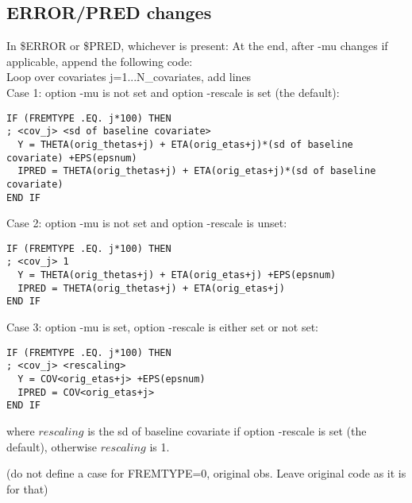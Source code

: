 \subsection{ERROR/PRED changes}
In \$ERROR or \$PRED, whichever is present:
At the end, after -mu changes if applicable, append the following code: \\
Loop over covariates j=1...N\_covariates, %
add lines\\
Case 1: option -mu is not set and option -rescale is set (the default):\\
\begin{verbatim}
IF (FREMTYPE .EQ. j*100) THEN
; <cov_j> <sd of baseline covariate>
  Y = THETA(orig_thetas+j) + ETA(orig_etas+j)*(sd of baseline covariate) +EPS(epsnum)
  IPRED = THETA(orig_thetas+j) + ETA(orig_etas+j)*(sd of baseline covariate)
END IF
\end{verbatim}

\noindent Case 2: option -mu is not set and option -rescale is unset:\\
\begin{verbatim}
IF (FREMTYPE .EQ. j*100) THEN
; <cov_j> 1
  Y = THETA(orig_thetas+j) + ETA(orig_etas+j) +EPS(epsnum)
  IPRED = THETA(orig_thetas+j) + ETA(orig_etas+j)
END IF
\end{verbatim}


\noindent Case 3: option -mu is set, option -rescale is either set or not set:\\
\begin{verbatim}
IF (FREMTYPE .EQ. j*100) THEN
; <cov_j> <rescaling>
  Y = COV<orig_etas+j> +EPS(epsnum)
  IPRED = COV<orig_etas+j>
END IF
\end{verbatim}
where $rescaling$ is the sd of baseline covariate if option -rescale is set (the default), otherwise $rescaling$ is 1.


(do not define a case for FREMTYPE=0, original obs. Leave original code as it is for that)



